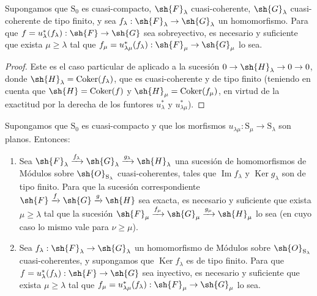 \begin{corollary}[8.5.7]
\label{IV.8.5.7}
Supongamos que $\mathrm{S}_0$ es cuasi-compacto, $\sh{F}_\lambda$ cuasi-coherente, $\sh{G}_\lambda$ cuasi-coherente de tipo finito, y sea $f_\lambda:\sh{F}_\lambda\to\sh{G}_\lambda$ un homomorfismo.
Para que $f=u_\lambda^*(f_\lambda):\sh{F}\to\sh{G}$ sea sobreyectivo, es necesario y suficiente que exista $\mu\geqslant\lambda$ tal que $f_\mu=u_{\lambda\mu}^*(f_\lambda):\sh{F}_\mu\to\sh{G}_\mu$ lo sea.
\end{corollary}

\begin{proof}
Este es el caso particular de  aplicado a la sucesión $0\to\sh{H}_\lambda\to 0\to 0$, donde $\sh{H}_\lambda=\operatorname{Coker}(f_\lambda)$, que es cuasi-coherente y de tipo finito (teniendo en cuenta que $\sh{H}=\operatorname{Coker}(f)$ y $\sh{H}_\mu=\operatorname{Coker}(f_\mu)$, en virtud de la exactitud por la derecha de los funtores $u_\lambda^*$ y $u_{\lambda\mu}^*$).
\end{proof}

\begin{corollary}[8.5.8]
\label{IV.8.5.8}
Supongamos que $\mathrm{S}_0$ es cuasi-compacto y que los morfismos $u_{\lambda\mu}:\mathrm{S}_\mu\to\mathrm{S}_\lambda$ son planos.
Entonces:
\begin{enumerate}[label=\textup{(\roman*)}]
  \item Sea $\sh{F}_\lambda\xrightarrow{f_\lambda}\sh{G}_\lambda\xrightarrow{g_\lambda}\sh{H}_\lambda$ una sucesión de homomorfismos de Módulos sobre $\sh{O}_{\mathrm{S}_\lambda}$ cuasi-coherentes, tales que $\operatorname{Im} f_\lambda$ y $\operatorname{Ker} g_\lambda$ son de tipo finito.
Para que la sucesión correspondiente $\sh{F}\xrightarrow{f}\sh{G}\xrightarrow{g}\sh{H}$ sea
exacta, es necesario y suficiente que exista $\mu\geqslant\lambda$ tal que la sucesión $\sh{F}_\mu\xrightarrow{f_\mu}\sh{G}_\mu\xrightarrow{g_\mu}\sh{H}_\mu$ lo sea (en cuyo caso lo mismo vale para $\nu\geqslant\mu$).
  \item Sea $f_\lambda:\sh{F}_\lambda\to\sh{G}_\lambda$ un homomorfismo de Módulos sobre $\sh{O}_{\mathrm{S}_\lambda}$ cuasi-coherentes, y supongamos que $\operatorname{Ker} f_\lambda$ es de tipo finito.
Para que $f=u_\lambda^*(f_\lambda):\sh{F}\to\sh{G}$ sea inyectivo, es necesario y suficiente que exista $\mu\geqslant\lambda$ tal que $f_\mu=u_{\lambda\mu}^*(f_\lambda):\sh{F}_\mu\to\sh{G}_\mu$ lo sea.
\end{enumerate}
\end{corollary}


